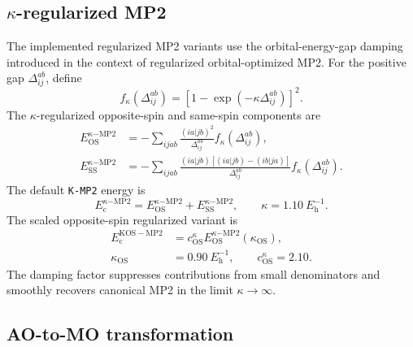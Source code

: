 \documentclass[aip,jcp,reprint,superscriptaddress]{revtex4-2}
\newcommand{\keyword}[1]{\texttt{#1}}
\newcommand{\Eh}{E_{\mathrm{h}}}
\begin{document}
\subsection{\(\kappa\)-regularized MP2}

The implemented regularized MP2 variants use the orbital-energy-gap damping introduced in the context of regularized orbital-optimized MP2.\cite{Lee2018}  For the positive gap \(\Delta_{ij}^{ab}\), define
\begin{equation}
  f_\kappa(\Delta_{ij}^{ab})
  =
  \left[1-\exp\left(-\kappa\Delta_{ij}^{ab}\right)\right]^2 .
  \label{eq:kappa_damping}
\end{equation}
The \(\kappa\)-regularized opposite-spin and same-spin components are
\begin{align}
  E_{\mathrm{OS}}^{\kappa\mathrm{-MP2}}
  &=
  -\sum_{ijab}
  \frac{(ia|jb)^2}{\Delta_{ij}^{ab}}
  f_\kappa(\Delta_{ij}^{ab}),\\
  E_{\mathrm{SS}}^{\kappa\mathrm{-MP2}}
  &=
  -\sum_{ijab}
  \frac{(ia|jb)\left[(ia|jb)-(ib|ja)\right]}{\Delta_{ij}^{ab}}
  f_\kappa(\Delta_{ij}^{ab}).
\end{align}
The default \keyword{K-MP2} energy is
\begin{equation}
  E_{\mathrm{c}}^{\kappa\mathrm{-MP2}}
  =
  E_{\mathrm{OS}}^{\kappa\mathrm{-MP2}}
  +
  E_{\mathrm{SS}}^{\kappa\mathrm{-MP2}},
  \qquad
  \kappa=1.10\ \Eh^{-1}.
\end{equation}
The scaled opposite-spin regularized variant is
\begin{align}
  E_{\mathrm{c}}^{\mathrm{KOS-MP2}}
  &=
  c_{\mathrm{OS}}^\kappa
  E_{\mathrm{OS}}^{\kappa\mathrm{-MP2}}(\kappa_{\mathrm{OS}}),
  \label{eq:kos_mp2}\\
  \kappa_{\mathrm{OS}}
  &=
  0.90\ \Eh^{-1},
  \qquad
  c_{\mathrm{OS}}^\kappa=2.10 .
\end{align}
The damping factor suppresses contributions from small denominators and smoothly recovers canonical MP2 in the limit \(\kappa\rightarrow\infty\).

\subsection{AO-to-MO transformation}
\end{document}
